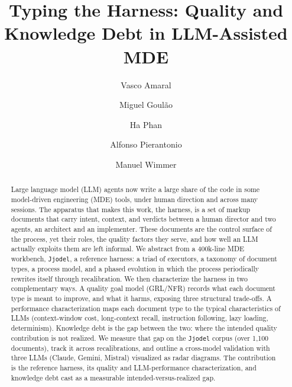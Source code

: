 \documentclass[sigconf]{acmart}
\begin{document}
\title{Typing the Harness: Quality and Knowledge Debt in LLM-Assisted MDE}

\author{Vasco Amaral}
\author{Miguel Goul\~ao}
\author{Ha Phan}
\author{Alfonso Pierantonio}
\author{Manuel Wimmer}

\begin{abstract}
Large language model (LLM) agents now write a large share of the code in some model-driven engineering (MDE) tools, under human direction and across many sessions. The apparatus that makes this work, the harness, is a set of markup documents that carry intent, context, and verdicts between a human director and two agents, an architect and an implementer. These documents are the control surface of the process, yet their roles, the quality factors they serve, and how well an LLM actually exploits them are left informal. We abstract from a 400k-line MDE workbench, \texttt{Jjodel}, a reference harness: a triad of executors, a taxonomy of document types, a process model, and a phased evolution in which the process periodically rewrites itself through recalibration. We then characterize the harness in two complementary ways. A quality goal model (GRL/NFR) records what each document type is meant to improve, and what it harms, exposing three structural trade-offs. A performance characterization maps each document type to the typical characteristics of LLMs (context-window cost, long-context recall, instruction following, lazy loading, determinism). Knowledge debt is the gap between the two: where the intended quality contribution is not realized. We measure that gap on the \texttt{Jjodel} corpus (over 1{,}100 documents), track it across recalibrations, and outline a cross-model validation with three LLMs (Claude, Gemini, Mistral) visualized as radar diagrams. The contribution is the reference harness, its quality and LLM-performance characterization, and knowledge debt cast as a measurable intended-versus-realized gap.
\end{abstract}
\end{document}
